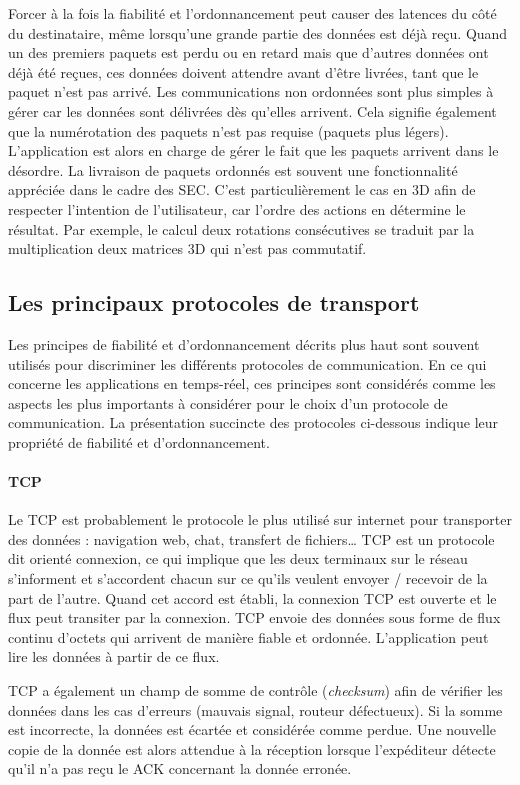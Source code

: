 Forcer à la fois la fiabilité et l'ordonnancement peut causer des latences du côté 
du destinataire, même lorsqu'une grande partie des données est déjà reçu. Quand 
un des premiers paquets est perdu ou en retard mais que d'autres données ont 
déjà été reçues, ces données doivent attendre avant d'être livrées, tant que le 
paquet n'est pas arrivé. Les communications non ordonnées sont plus simples à 
gérer car les données sont délivrées dès qu'elles arrivent. Cela signifie également 
que la numérotation des paquets n'est pas requise (paquets plus légers). 
L'application est alors en charge de gérer le fait que les paquets arrivent dans le 
désordre. La livraison de paquets ordonnés est souvent une fonctionnalité 
appréciée dans le 
cadre des \gls{SEC}. C'est particulièrement le cas en \gls{3D} afin de respecter 
l'intention de l'utilisateur, car l'ordre des actions en détermine le résultat. Par 
exemple, le calcul deux rotations consécutives se traduit par la multiplication deux 
matrices \gls{3D} qui n'est pas commutatif.

\subsection{Les principaux protocoles de transport}
Les principes de fiabilité et d'ordonnancement décrits plus haut sont souvent 
utilisés pour discriminer les différents protocoles de communication. En ce qui concerne les 
applications en temps-réel, ces principes sont considérés comme les aspects les plus 
importants à considérer pour le choix d'un protocole de communication. La 
présentation succincte des protocoles ci-dessous indique leur propriété de 
fiabilité et d'ordonnancement.
\paragraph{TCP}
Le \gls{TCP} est probablement le protocole le plus utilisé sur internet pour 
transporter des données : navigation web, chat, transfert de fichiers\dots 
\gls{TCP} est un protocole dit \og orienté connexion\fg{}, ce qui implique que les 
deux terminaux sur le réseau s'informent et s'accordent chacun sur ce qu'ils 
veulent envoyer / recevoir de la part de l'autre. 
Quand cet accord est établi, la connexion \gls{TCP} est ouverte et le flux peut 
transiter par la connexion. 
\gls{TCP} envoie des données sous forme de flux continu d'octets qui arrivent de 
manière fiable et ordonnée. 
L'application peut lire les données à partir de ce flux.

\gls{TCP} a également un champ de somme de contrôle (\textit{checksum}) afin 
de vérifier les données dans les cas d'erreurs (mauvais signal, routeur 
défectueux). 
Si la somme est incorrecte, la données est écartée et considérée comme perdue. 
Une nouvelle copie de la donnée est alors attendue à la réception lorsque 
l'expéditeur détecte qu'il n'a pas reçu le ACK concernant la donnée erronée.

